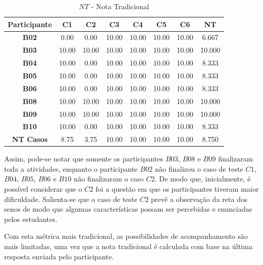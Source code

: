 \begin{table}[htbp]
	\centering
	\caption{$NT$ - Nota Tradicional}
	\begin{tabular}{|c|c|c|c|c|c|c|c|}
		\hline
		\rowcolor[HTML]{D9D9D9} 
		\cellcolor[HTML]{D0CECE}\textbf{Participante} & \textbf{C1} & \textbf{C2} & \textbf{C3} & \textbf{C4} & \textbf{C5} & \textbf{C6} & \textbf{NT} \\ \hline
		\textbf{B02}     & 0.00  & 0.00  & 10.00 & 10.00 & 10.00 & 10.00 & 6.667  \\ \hline
		\rowcolor[HTML]{F2F2F2} 
		\textbf{B03}     & 10.00 & 10.00 & 10.00 & 10.00 & 10.00 & 10.00 & 10.000 \\ \hline
		\textbf{B04}     & 10.00 & 0.00  & 10.00 & 10.00 & 10.00 & 10.00 & 8.333  \\ \hline
		\rowcolor[HTML]{F2F2F2} 
		\textbf{B05}     & 10.00 & 0.00  & 10.00 & 10.00 & 10.00 & 10.00 & 8.333  \\ \hline
		\textbf{B06}     & 10.00 & 0.00  & 10.00 & 10.00 & 10.00 & 10.00 & 8.333  \\ \hline
		\rowcolor[HTML]{F2F2F2} 
		\textbf{B08}     & 10.00 & 10.00 & 10.00 & 10.00 & 10.00 & 10.00 & 10.000 \\ \hline
		\textbf{B09}     & 10.00 & 10.00 & 10.00 & 10.00 & 10.00 & 10.00 & 10.000 \\ \hline
		\rowcolor[HTML]{EFEFEF} 
		\textbf{B10}     & 10.00 & 0.00  & 10.00 & 10.00 & 10.00 & 10.00 & 8.333  \\ \hline
		\rowcolor[HTML]{D0CECE} 
		\textbf{NT Casos} & 8.75  & 3.75  & 10.00 & 10.00 & 10.00 & 10.00 & 8.750   \\ \hline
	\end{tabular}
	\label{tab:F3_A3_NT}
\end{table}

Assim, pode-se notar que somente os participantes $B03$, $B08$ e $B09$ finalizaram toda a atividades, enquanto o participante $B02$ não finalizou o caso de teste $C1$, $B04$, $B05$, $B06$ e $B10$ não finalizaram o caso $C2$. De modo que, inicialmente, é possível considerar que o $C2$ foi a questão em que os participantes tiveram maior dificuldade. Salienta-se que o caso de teste $C2$ prevê a observação da reta dos senos de modo que algumas características possam ser percebidas e enunciadas pelos estudantes. 

Com esta métrica mais tradicional, as possibilidades de acompanhamento são mais limitadas, uma vez que a nota tradicional é calculada com base na última resposta enviada pelo participante.

